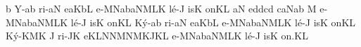 

\Internote
\nosolesmescustos
{}
\initiumgregorianum
\znotes\fissum{1pt}\bmolle b\en
{}%
\sgn {}Y-\pes ab\egn
\sgn ri-\clivis aN\egn
\sgn {}e{}\clivis aK\augmentumduplex bL\egn
\spatium
\begingroup
\bgenerale
\Asteriscus
\divisiominima
\spatium
\sgn {}e-\Salicus MNa\nonspatium\climacus baN\nonspatium\climacus MLK\egn
\sgn l{\'e}-\punctum J\egn
\sgn {}is\punctum K\egn
\sgn {}on\punctum K\augmentum L\egn
\spatium
\divisiofinalis
\spatium
{}\clivis aN\egn
\sgn {}e{}\virga d\augmentum d\pes cd\spatiumparvum\punctuminclinatum
c\spatiumparvum\punctuminclinatum a\nonspatium\punctuminclinatum N\punctum a\augmentum b\egn
\spatium
\divisiominima
\spatium
\custos M
\lineaproxima
\sgn {}e-\Salicus MNa\nonspatium\climacus baN\nonspatium\climacus MLK\egn
\sgn l{\'e}-\punctum J\egn
\sgn {}is\punctum K\egn
\sgn {}on\punctum K\augmentum L\egn
\spatium
\divisiofinalis
\spatium
\sgn K{\'y}-\pes ab\egn
\sgn ri-\clivis aN\egn
\sgn {}e{}\clivis aK\augmentumduplex bL\egn
\spatium
\divisiominima
\spatium
\sgn {}e-\Salicus MNa\nonspatium\climacus baN\nonspatium\climacus MLK\egn
\sgn l{\'e}-\punctum J\egn
\sgn {}is\punctum K\egn
\sgn {}on\punctum K\augmentum L\egn
\spatium
\divisiofinalis
\spatium
\sgn K{\'y}-\torculus KMK\egn
\custos J
\lineaproxima
\sgn ri-\pes JK\egn
\sgn {}e{}\punctum K\augmentum L\virga N\augmentum N\pes MN\spatiumparvum\punctuminclinatum M\spatiumparvum\punctuminclinatum K\nonspatium\punctuminclinatum J\punctum K\augmentum L\egn
\Asteriscus
\spatium
\divisiominima
\spatium
\sgn {}e-\Salicus MNa\nonspatium\climacus baN\nonspatium\climacus MLK\egn
\sgn l{\'e}-\punctum J\egn
\sgn {}is\punctum K\egn
\sgn {}o{n.}\punctum K\augmentum L\egn
\spatium
\endgroup
\Finisgregoriana

